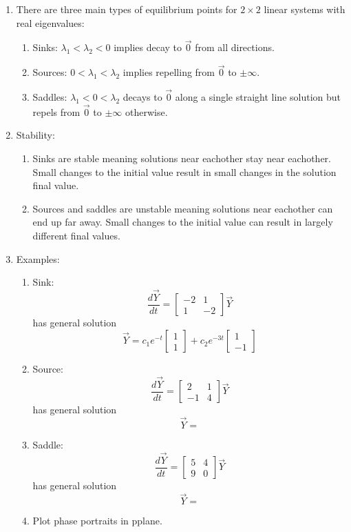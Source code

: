 \documentclass{article}
\begin{document}
\begin{enumerate}

\item There are three main types of equilibrium points for $2 \times 2$ linear systems with real eigenvalues:
\begin{enumerate}
\item Sinks: $\lambda_1 < \lambda_2 < 0$ implies decay to $\vec{0}$ from all directions.
\item Sources: $0<\lambda_1 < \lambda_2$ implies repelling from $\vec{0}$ to $\pm \infty$.
\item Saddles: $\lambda_1 < 0 < \lambda_2$ decays to $\vec{0}$ along a single straight line solution but repels from $\vec{0}$ to $\pm \infty$ otherwise.
\end{enumerate}

\item Stability:
\begin{enumerate}
\item Sinks are stable meaning solutions near eachother stay near eachother. Small changes to the initial value result in small changes in the solution final value.
\item Sources and saddles are unstable meaning solutions near eachother can end up far away. Small changes to the initial value can result in largely different final values.
\end{enumerate}

\item Examples:
\begin{enumerate}
\item Sink:
\[
\frac{d\vec{Y}}{dt} = 
\begin{bmatrix}
-2 & 1 \\
1 & -2
\end{bmatrix} \vec{Y}
\]
has general solution
\[
\vec{Y} = c_1 e^{-t}
\begin{bmatrix}
1 \\ 1
\end{bmatrix}
+
c_2 e^{-3t}
\begin{bmatrix}
1 \\ -1
\end{bmatrix}
\]
\item Source:
\[
\frac{d\vec{Y}}{dt} = 
\begin{bmatrix}
2 & 1 \\
-1 & 4
\end{bmatrix} \vec{Y}
\]
has general solution
\[
\vec{Y} =
\]
\item Saddle:
\[
\frac{d\vec{Y}}{dt} = 
\begin{bmatrix}
5 & 4 \\
9 & 0
\end{bmatrix} \vec{Y}
\]
has general solution
\[
\vec{Y} = 
\]
\item Plot phase portraits in pplane.
\end{enumerate}


\end{enumerate}
\end{document}
